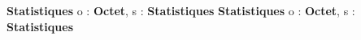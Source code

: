 \documentclass[10pt]{article}
\begin{document}
\begin{algorithme}
    {}{\textbf{Statistiques}}
    {}
    {o : \textbf{Octet}, s : \textbf{Statistiques}}
    {\textbf{Statistiques}}
    {}
    {o : \textbf{Octet}, s : \textbf{Statistiques}}
    {\naturel}
    {}
\end{algorithme}
\end{document}
